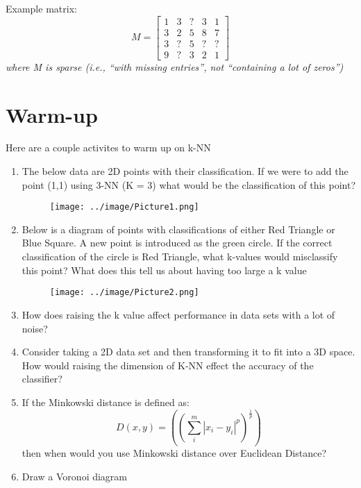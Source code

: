 \documentclass{report}
\begin{document}
Example matrix:
			\[
     			M=
  				\begin{bmatrix}
    					1 & 3 & ? & 3 & 1 \\
    					3 & 2 & 5 & 8 & 7 \\
    					3 & ? & 5 & ? & ? \\
    					9 & ? & 3 & 2 & 1
  				\end{bmatrix}
			\]
\textit{ where M is sparse (i.e., “with missing entries”, not “containing a lot of zeros”)}





\section*{Warm-up}
Here are a couple activites to warm up on k-NN 
\begin{enumerate}
	\item The below data are 2D points with their classification. If we were to add the point (1,1) using 3-NN (K = 3) what would be the classification of this point?
	\begin{figure}[H]
		\centering
		\texttt{[image: ../image/Picture1.png]}
	\end{figure}
	\item Below is a diagram of points with classifications of either Red Triangle or Blue Square. A new point is introduced as the green circle. If the correct classification of the circle is Red Triangle, what k-values would misclassify this point? What does this tell us about having too large a k value
	\begin{figure}[H]
		\centering
		\texttt{[image: ../image/Picture2.png]}
	\end{figure}
	\item How does raising the k value affect performance in data sets with a lot of noise? 
	\item Consider taking a 2D data set and then transforming it to fit into a 3D space. How would raising the dimension of K-NN effect the accuracy of the classifier?
	\item If the Minkowski distance is defined as: 
	\begin{equation}
	D (x, y) = ((\sum_{i}^{m}| x_{i} - y_{i}|^p)^\frac{1}{p})
	\end{equation}
     then when would you use Minkowski distance over Euclidean Distance?
	

\item Draw a Voronoi diagram
\end{enumerate}
\end{document}
